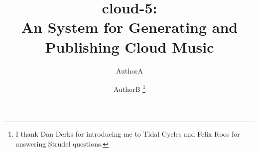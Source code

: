 \documentclass[runningheads,a4paper]{llncs}
\begin{document}
\mainmatter  %

\title{cloud-5:\\An System for Generating and Publishing Cloud Music}




\author{AuthorA\and AuthorB \thanks{I thank Dan Derks for introducing me to Tidal Cycles and Felix Roos for answering Strudel questions.}}
%


%
%


\maketitle
\end{document}
